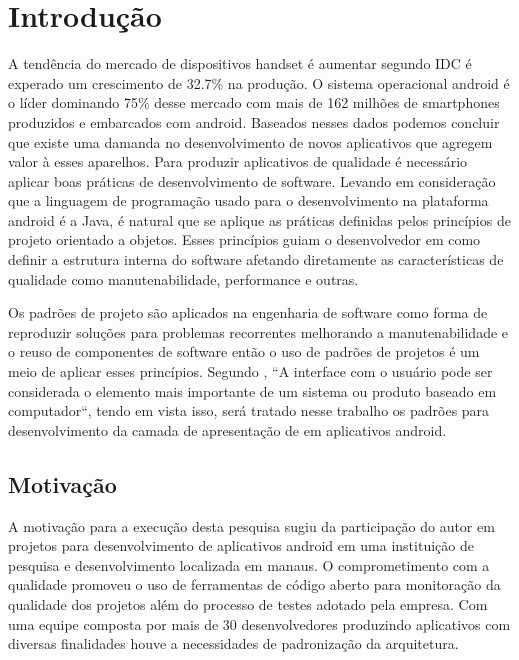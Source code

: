\chapter{Introdução}

A tendência do mercado de dispositivos  handset é aumentar segundo IDC  é
experado um crescimento de 32.7\% na produção\cite{idc:a}. O sistema operacional
android é o líder dominando 75\% desse mercado com mais de 162 milhões de
smartphones produzidos e embarcados com android\cite{idc:b}. Baseados nesses
dados podemos concluir que existe uma damanda no desenvolvimento de novos 
aplicativos que agregem valor à esses aparelhos.
Para produzir aplicativos de qualidade é necessário aplicar boas práticas de
desenvolvimento de software. Levando em consideração que a linguagem de
programação usado para o desenvolvimento na plataforma android é a Java, é
natural que se aplique as práticas definidas pelos princípios de projeto
orientado a objetos. Esses princípios guiam o desenvolvedor em como definir a
estrutura interna do software afetando diretamente as características  de
qualidade como manutenabilidade, performance e outras\cite{tempero-di}.

Os padrões de projeto são aplicados na engenharia de software como forma de
reproduzir  soluções  para problemas recorrentes melhorando a manutenabilidade e
o reuso de componentes de software\cite{gof} então o uso de padrões de projetos
é um meio de aplicar esses princípios. Segundo , ``A
interface com o usuário pode ser considerada o elemento mais importante de
um sistema ou produto baseado em computador``, tendo em vista isso, será tratado
nesse trabalho  os padrões para desenvolvimento da camada de apresentação de 
em aplicativos android.

\section{Motivação}

A motivação para a execução desta pesquisa sugiu da participação do autor em
projetos para desenvolvimento de aplicativos android em uma instituição de
pesquisa e desenvolvimento localizada em manaus. O comprometimento com a
qualidade promoveu o uso de ferramentas de código aberto para monitoração da
qualidade dos projetos além do processo de testes adotado pela empresa. Com uma
equipe composta por mais de 30 desenvolvedores produzindo aplicativos com
diversas finalidades houve a necessidades de padronização da arquitetura.

